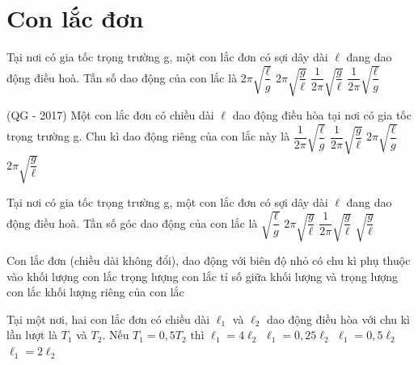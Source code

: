 \section{Con lắc đơn}
\begin{ex}%
Tại nơi có gia tốc trọng trường g, một con lắc đơn có sợi dây dài $\ell $ đang dao động điều hoà. Tần số dao động của con lắc là
\choice
{$2\pi \sqrt{\dfrac{\ell}{g}}$}
{$2\pi \sqrt{\dfrac{g}{\ell}}$}
{\True $\dfrac{1}{2\pi}\sqrt{\dfrac{g}{\ell}}$}
{$\dfrac{1}{2\pi}\sqrt{\dfrac{\ell}{g}}$}
\end{ex} 
\begin{ex}%
(QG - 2017) Một con lắc đơn có chiều dài $\ell$ dao động điều hòa tại nơi có gia tốc trọng trường g. Chu kì dao động riêng của con lắc này là
\choice
{$\dfrac{1}{2\pi}\sqrt{\dfrac{\ell}{g}}$}
{$\dfrac{1}{2\pi}\sqrt{\dfrac{g}{\ell}}$}
{\True $2\pi \sqrt{\dfrac{\ell}{g}}$}
{$2\pi \sqrt{\dfrac{g}{\ell}}$}
\end{ex} 
\begin{ex}%
Tại nơi có gia tốc trọng trường g, một con lắc đơn có sợi dây dài $\ell$ đang dao động điều hoà. Tần số góc dao động của con lắc là
\choice
{$\sqrt{\dfrac{\ell}{g}}$}
{$2\pi \sqrt{\dfrac{g}{\ell}}$}
{$\dfrac{1}{2\pi}\sqrt{\dfrac{g}{\ell}}$}
{\True $\sqrt{\dfrac{g}{\ell}}$}
\end{ex} 
\begin{ex}%
Con lắc đơn (chiều dài không đổi), dao động với biên độ nhỏ có chu kì phụ thuộc vào
\choice
{khối lượng con lắc}
{trọng lượng con lắc}
{\True tỉ số giữa khối lượng và trọng lượng con lắc}
{khối lượng riêng của con lắc}
\end{ex} 
\begin{ex}%
Tại một nơi, hai con lắc đơn có chiều dài $\ell _1$ và $\ell _2$ dao động điều hòa với chu kì lần lượt là $T_1$ và $T_2$. Nếu $T_1=0,5T_2$ thì
\choice
{$\ell _1=4\ell _2$}
{\True $\ell _1=0,25\ell _2$}
{$\ell _1=0,5\ell _2$}
{$\ell _1=2\ell _2$}
\end{ex} 
